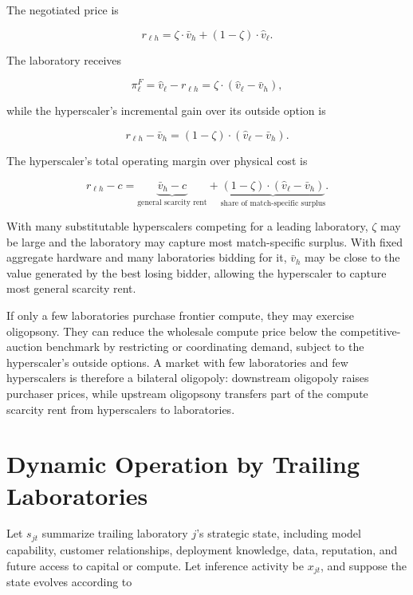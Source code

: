 \documentclass[11pt]{article}
\begin{document}
The negotiated price is

\begin{equation}r_{\ell h}=\zeta\cdot\bar v_h+\left(1-\zeta\right)\cdot\widehat v_\ell.\end{equation}

The laboratory receives

\begin{equation}\pi_\ell^F=\widehat v_\ell-r_{\ell h}=\zeta\cdot\left(\widehat v_\ell-\bar v_h\right),\end{equation}

while the hyperscaler's incremental gain over its outside option is

\begin{equation}r_{\ell h}-\bar v_h=\left(1-\zeta\right)\cdot\left(\widehat v_\ell-\bar v_h\right).\end{equation}

The hyperscaler's total operating margin over physical cost is

\begin{equation}r_{\ell h}-c=\underbrace{\bar v_h-c}_{\text{general scarcity rent}}+\underbrace{\left(1-\zeta\right)\cdot\left(\widehat v_\ell-\bar v_h\right)}_{\text{share of match-specific surplus}}.\end{equation}

With many substitutable hyperscalers competing for a leading laboratory, $\zeta$ may be large and the laboratory may capture most match-specific surplus. With fixed aggregate hardware and many laboratories bidding for it, $\bar v_h$ may be close to the value generated by the best losing bidder, allowing the hyperscaler to capture most general scarcity rent.

If only a few laboratories purchase frontier compute, they may exercise oligopsony. They can reduce the wholesale compute price below the competitive-auction benchmark by restricting or coordinating demand, subject to the hyperscaler's outside options. A market with few laboratories and few hyperscalers is therefore a bilateral oligopoly: downstream oligopoly raises purchaser prices, while upstream oligopsony transfers part of the compute scarcity rent from hyperscalers to laboratories.

\section{Dynamic Operation by Trailing Laboratories}
\label{app:dynamic-loss}

Let $s_{jt}$ summarize trailing laboratory $j$'s strategic state, including model capability, customer relationships, deployment knowledge, data, reputation, and future access to capital or compute. Let inference activity be $x_{jt}$, and suppose the state evolves according to
\end{document}

